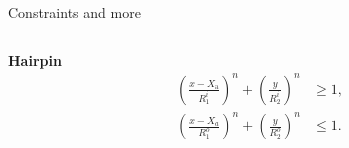 \begin{frame}{Constraints and more}
    \begin{columns}
        \begin{column}{0.3\textwidth}
            \textbf{Hairpin}
            \begin{align*}
                \left(\frac{x-X_\text{a}}{R_1^i}\right)^n + \left(\frac{y}{R_2^i}\right)^n & \geq 1, \\
                \left(\frac{x-X_a}{R_1^o}\right)^n + \left(\frac{y}{R_2^o}\right)^n & \leq 1.
            \end{align*}
            

\end{column}
\end{columns}
\end{frame}
